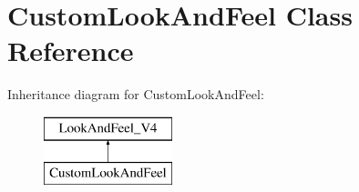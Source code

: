 \hypertarget{class_custom_look_and_feel}{}\section{Custom\+Look\+And\+Feel Class Reference}
\label{class_custom_look_and_feel}
Inheritance diagram for Custom\+Look\+And\+Feel\+:\begin{figure}[H]
\begin{center}
\leavevmode
\includegraphics[height=2.000000cm]{class_custom_look_and_feel}
\end{center}
\end{figure}
